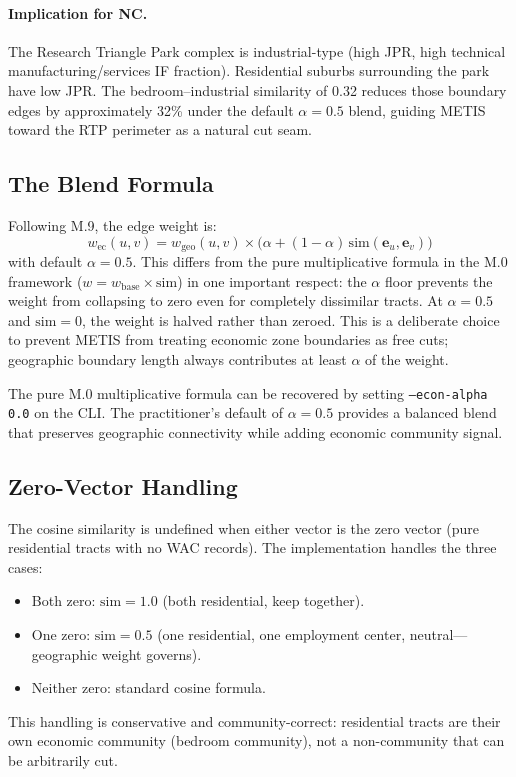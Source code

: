 \paragraph{Implication for NC.}
The Research Triangle Park complex is industrial-type (high JPR, high technical
manufacturing/services IF fraction).
Residential suburbs surrounding the park have low JPR.
The bedroom--industrial similarity of 0.32 reduces those boundary edges by
approximately 32\% under the default $\alpha = 0.5$ blend, guiding METIS
toward the RTP perimeter as a natural cut seam.

\subsection{The Blend Formula}

Following M.9, the edge weight is:
\begin{equation}
  w_{\mathrm{ec}}(u, v)
  = w_{\mathrm{geo}}(u, v)
  \times \bigl(\alpha + (1 - \alpha)\,\mathrm{sim}(\mathbf{e}_u, \mathbf{e}_v)\bigr)
  \label{eq:blend}
\end{equation}
with default $\alpha = 0.5$.
This differs from the pure multiplicative formula in the M.0 framework
($w = w_{\mathrm{base}} \times \mathrm{sim}$) in one important respect:
the $\alpha$ floor prevents the weight from collapsing to zero even for
completely dissimilar tracts.
At $\alpha = 0.5$ and $\mathrm{sim} = 0$, the weight is halved rather than
zeroed.
This is a deliberate choice to prevent METIS from treating economic zone
boundaries as free cuts; geographic boundary length always contributes at
least $\alpha$ of the weight.

The pure M.0 multiplicative formula can be recovered by setting
\texttt{--econ-alpha 0.0} on the CLI.
The practitioner's default of $\alpha = 0.5$ provides a balanced blend that
preserves geographic connectivity while adding economic community signal.

\subsection{Zero-Vector Handling}

The cosine similarity is undefined when either vector is the zero vector
(pure residential tracts with no WAC records).
The implementation handles the three cases:
\begin{itemize}
  \item Both zero: $\mathrm{sim} = 1.0$ (both residential, keep together).
  \item One zero: $\mathrm{sim} = 0.5$ (one residential, one employment center,
    neutral---geographic weight governs).
  \item Neither zero: standard cosine formula.
\end{itemize}
This handling is conservative and community-correct: residential tracts are
their own economic community (bedroom community), not a non-community that can
be arbitrarily cut.

